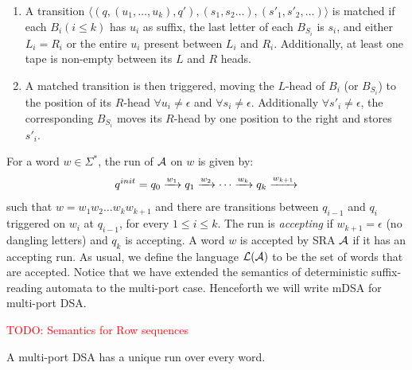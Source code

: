 \begin{enumerate}
\item A transition $\langle (q, (u_1, \dots, u_k), q') , (s_1, s_2 \dots), (s'_1,s'_2,\dots) \rangle$ is matched if each $B_i (i\le k)$ has $u_i$ as suffix, the last letter of each $B_{S_i}$ is $s_i$, and either $L_i=R_i$ or the entire $u_i$ present between $L_i$ and $R_i$. Additionally, at least one tape is non-empty between its $L$ and $R$ heads.

\item A matched transition is then triggered, moving  the $L$-head of $B_i$ (or $B_{S_i}$) to the position of its $R$-head $\forall u_i \ne \epsilon$ and $\forall s_i \ne \epsilon$. Additionally $\forall s'_i \ne \epsilon$, the corresponding $B_{S_i}$ moves its $R$-head by one position to the right and stores $s'_i$.
\end{enumerate}


 For a word $w \in \Sigma^*$, the run of $\mathcal{A}$ on $w$ is given by:
 \begin{align*}
   q^{init} = q_0 \xrightarrow{w_1} q_1 \xrightarrow{w_2} \cdots \xrightarrow{w_{k}} q_k \xrightarrow{w_{k+1}}
 \end{align*}
 such that $w = w_1 w_2 \dots w_kw_{k+1}$ and there are transitions
 between $q_{i-1}$ and $q_i$ triggered on $w_i$ at $q_{i-1}$, for
 every $1 \le i \le k$. The run is \emph{accepting} if
 $w_{k+1} = \epsilon$ (no dangling letters) and $q_k$ is accepting. A
 word $w$ is accepted by SRA $\mathcal{A}$ if it has an accepting run. As
 usual, we define the language $\mathcal{L}(\mathcal{A})$ to be the set of words that
 are accepted. Notice that we have extended the semantics of
 deterministic suffix-reading automata to the multi-port
 case. Henceforth we will write mDSA for multi-port DSA.%

\textcolor{red}{TODO: Semantics for Row sequences}

\begin{lemma}
 A multi-port DSA has a unique run over every word.
\end{lemma}%

